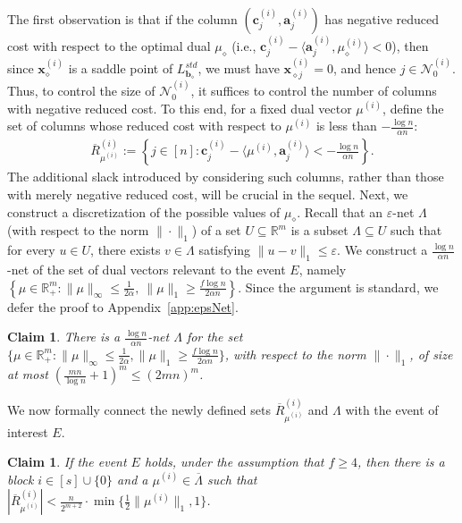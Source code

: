 \documentclass{article}
\newcommand{\R}{\mathbb{R}}
\newcommand{\ip}{\iprods}
\newcommand{\av}[0]{\mathbf{a}}
\newcommand{\cv}[0]{\mathbf{c}}
\newcommand{\xv}[0]{\mathbf{x}}
\newcommand{\bv}[0]{\mathbf{b}}
\newcommand{\normm}[1]{\big\lVert#1\big\rVert}
\newcommand{\iprods}[2]{\langle {#1}, {#2} \rangle}
\newcommand{\colij}{\av^{(i)}_j}
\newtheorem{claim}[thm]{Claim}
\newcommand{\nrc}{R}
\begin{document}
The first observation is that if the column $(\cv^{(i)}_j, \colij)$ has negative reduced cost with respect to the optimal dual $\mu_{\diamond}$ (i.e.,
$\cv^{(i)}_j - \ip{\colij}{\mu^{(i)}_{\diamond}} < 0$), then since $\xv_{\diamond}^{(i)}$ is a saddle point of $L^{std}_{\bv_{\diamond}}$, we must have $\xv^{(i)}_{\diamond j} = 0$, and hence $j \in \mathcal{N}_0^{(i)}$.
Thus, to control the size of $\mathcal{N}_0^{(i)}$, it suffices to control the number of columns with negative reduced cost.
To this end, for a fixed dual vector $\mu^{(i)}$, define the set of columns whose reduced cost with respect to $\mu^{(i)}$ is less than $-\frac{\log n}{\alpha n}$:
%
\begin{align*}
    \overline{\nrc}^{(i)}_{\mu^{(i)}}
    := \left\{
        j \in [n] :
        \cv^{(i)}_j - \ip{\mu^{(i)}}{\colij}
        < - \frac{\log n}{\alpha n}
    \right\}.
\end{align*}
The additional slack introduced by considering such columns, rather than those with merely negative reduced cost, will be crucial in the sequel.
Next, we construct a discretization of the possible values of $\mu_{\diamond}$.
Recall that an $\varepsilon$-net $\Lambda$ (with respect to the norm $\|\cdot\|_1$) of a set $U \subseteq \mathbb{R}^m$ is a subset $\Lambda \subseteq U$ such that for every $u \in U$, there exists $v \in \Lambda$ satisfying $\|u - v\|_1 \le \varepsilon$.
We construct a $\frac{\log n}{\alpha n}$-net of the set of dual vectors relevant to the event $E$, namely
$\left\{
\mu \in \mathbb{R}^m_+ :
\|\mu\|_{\infty} \le \frac{1}{2\alpha},
\ \|\mu\|_1 \ge \frac{f \log n}{2\alpha n}
\right\}.$
Since the argument is standard, we defer the proof to Appendix~\ref{app:epsNet}.

\begin{claim} \label{claim:epsNet}
    There is a $\frac{\log n}{\alpha n}$-net $\Lambda$ for the set $\{ \mu \in \R^m_+ : \|\mu\|_{\infty} \le \frac{1}{2\alpha}, \|\mu\|_1 \ge \frac{f \log n}{2 \alpha n}\}$, with respect to the norm $\|\cdot\|_1$, of size at most $(\frac{mn}{\log n} + 1)^m \le (2mn)^m$.
\end{claim}

We now formally connect the newly defined sets $\overline{\nrc}^{(i)}_{\mu^{(i)}}$ and $\Lambda$ with the event of interest $E$.

\begin{claim}
    If the event $E$ holds, under the assumption that $f\geq 4$, then there is a block $i \in [s] \cup \{0\}$ and a $\mu^{(i)} \in \overline{\Lambda}$ such that $|\overline{\nrc}^{(i)}_{\mu^{(i)}}| < \frac{n}{2^{m+{2}}} \cdot \min\big\{ \frac{1}{2} \normm{\mu^{(i)}}_1, 1\big\} $.
\end{claim}
\end{document}
